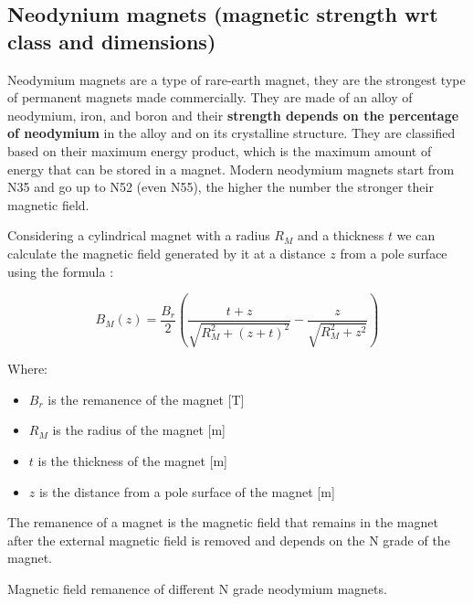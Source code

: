 \subsection{Neodynium magnets (magnetic strength wrt class and dimensions)}
Neodymium magnets are a type of rare-earth magnet, they are the strongest type of permanent magnets made commercially.
They are made of an alloy of neodymium, iron, and boron and their \textbf{strength depends on the percentage of neodymium} in the alloy and on its crystalline structure.
They are classified based on their maximum energy product, which is the maximum amount of energy that can be stored in a magnet. Modern neodymium magnets start from N35 and go up to N52 (even N55), the higher the number the stronger their magnetic field.

\begin{samepage}
    Considering a cylindrical magnet with a radius $R_M$ and a thickness $t$ we can calculate the magnetic field generated by it at a distance $z$ from a pole surface using the formula \cite{Magnetic_field_perm_magnet}:
    \nopagebreak

    \begin{equation}
        B_M(z) = \frac{B_r}{2} \left( \frac{t+z}{\sqrt{R_M^2+(z+t)^2}} - \frac{z}{\sqrt{R_M^2+z^2}} \right) 
        \label{eq: Magnetic_field_perm_magnet}
    \end{equation}
    \nopagebreak

    Where: 
    \begin{itemize}
        \item $B_r$ is the remanence of the magnet [T]
        \item $R_M$ is the radius of the magnet [m]
        \item $t$ is the thickness of the magnet [m]
        \item $z$ is the distance from a pole surface of the magnet [m]
    \end{itemize}
\end{samepage}
    
\begin{samepage}
    The remanence of a magnet is the magnetic field that remains in the magnet after the external magnetic field is removed and depends on the N grade of the magnet.
    \nopagebreak

    \begin{table}[H]
        \centering
        \resizebox{.6\linewidth}{!}{
            
        }
        \caption{Magnetic field remanence of different N grade neodymium magnets.}
        \label{tab: magnet_grades}
    \end{table}
\end{samepage}
